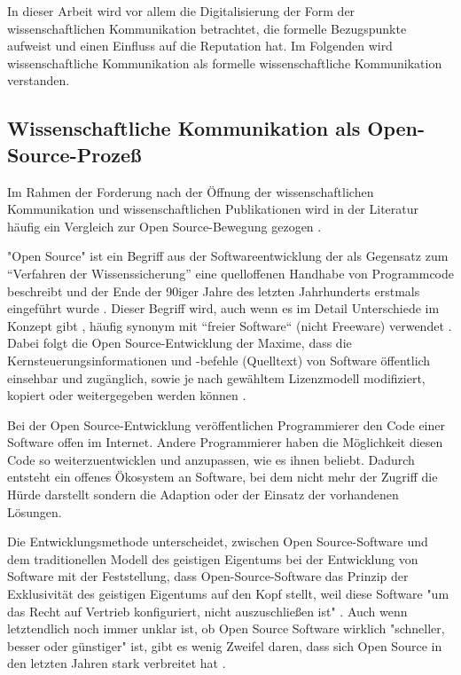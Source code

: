 In dieser Arbeit wird vor allem die Digitalisierung der Form der wissenschaftlichen Kommunikation betrachtet, die formelle Bezugspunkte aufweist und einen Einfluss auf die Reputation hat. Im Folgenden wird wissenschaftliche Kommunikation als formelle wissenschaftliche Kommunikation verstanden.

\subsection{Wissenschaftliche Kommunikation als Open-Source-Prozeß}
Im Rahmen der Forderung nach der Öffnung der wissenschaftlichen Kommunikation und wissenschaftlichen Publikationen wird in der Literatur häufig ein Vergleich zur Open Source-Bewegung gezogen \cite{suchen}.

"Open Source" ist ein Begriff aus der Softwareentwicklung der als Gegensatz zum “Verfahren der Wissenssicherung” \cite{stallman2002} eine quelloffenen Handhabe von Programmcode beschreibt und der Ende der 90iger Jahre des letzten Jahrhunderts erstmals eingeführt wurde  \cite{suchen}. Dieser Begriff wird, auch wenn es im Detail Unterschiede im Konzept gibt \cite{suchen}, häufig synonym mit “freier Software“ (nicht Freeware) verwendet \cite{suchen}. Dabei folgt die Open Source-Entwicklung der Maxime, dass die Kernsteuerungsinformationen und -befehle (Quelltext) von Software öffentlich einsehbar und zugänglich, sowie je nach gewähltem Lizenzmodell modifiziert, kopiert oder weitergegeben werden können \cite{suchen}.

Bei der Open Source-Entwicklung veröffentlichen Programmierer den Code einer Software offen im Internet. Andere Programmierer haben die Möglichkeit diesen Code so weiterzuentwicklen und anzupassen, wie es ihnen beliebt. Dadurch entsteht ein offenes Ökosystem an Software, bei dem nicht mehr der Zugriff die Hürde darstellt sondern die Adaption oder der Einsatz der vorhandenen Lösungen.

Die Entwicklungsmethode unterscheidet, zwischen Open Source-Software und dem traditionellen Modell des geistigen Eigentums bei der Entwicklung von Software mit der Feststellung, dass Open-Source-Software das Prinzip der Exklusivität des geistigen Eigentums auf den Kopf stellt, weil diese Software "um das Recht auf Vertrieb konfiguriert, nicht auszuschließen ist" \cite{suchen}. Auch wenn letztendlich noch immer unklar ist, ob Open Source Software wirklich "schneller, besser oder günstiger" ist, gibt es wenig Zweifel daren, dass sich Open Source in den letzten Jahren stark verbreitet hat \cite{Lerner_2001}.

